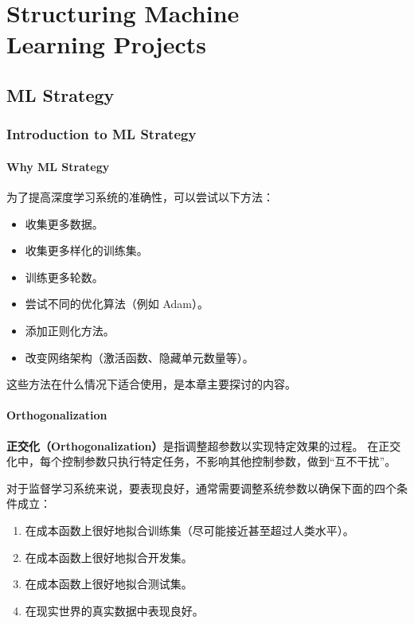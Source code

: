\chapter[Structuring Machine Learning Projects]{Structuring Machine \\Learning Projects}

\section{ML Strategy}


\subsection{Introduction to ML Strategy}

\subsubsection{Why ML Strategy}

为了提高深度学习系统的准确性，可以尝试以下方法：

\begin{itemize}
    \item 收集更多数据。
    \item 收集更多样化的训练集。
    \item 训练更多轮数。
    \item 尝试不同的优化算法（例如 Adam）。
    \item 添加正则化方法。
    \item 改变网络架构（激活函数、隐藏单元数量等）。
\end{itemize}

这些方法在什么情况下适合使用，是本章主要探讨的内容。

\subsubsection{Orthogonalization}

\textbf{正交化（Orthogonalization）}是指调整超参数以实现特定效果的过程。
在正交化中，每个控制参数只执行特定任务，不影响其他控制参数，做到“互不干扰”。

对于监督学习系统来说，要表现良好，通常需要调整系统参数以确保下面的四个条件成立：

\begin{enumerate}
    \item 在成本函数上很好地拟合训练集（尽可能接近甚至超过人类水平）。
    \item 在成本函数上很好地拟合开发集。
    \item 在成本函数上很好地拟合测试集。
    \item 在现实世界的真实数据中表现良好。
\end{enumerate}


